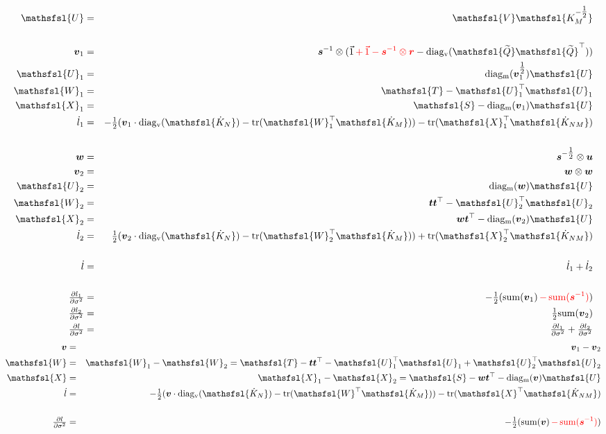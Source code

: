 \documentclass[10pt]{report}
\newcommand{\red}{\textcolor{red}}
\newcommand{\blue}{\textcolor{blue}}
\newcommand{\onehalf}{\tfrac{1}{2}}
\newcommand{\mat}[1]{\mbox{$\mathsfsl{#1}$}}
\newcommand{\myvec}[1]{\mbox{\boldmath$#1$}}
\newcommand{\diagv}[1]{\mathrm{diag_v}(#1)}
\newcommand{\diagm}[1]{\mathrm{diag_m}(#1)}
\newcommand{\trace}[1]{\mathrm{tr}(#1)}
\newcommand{\transv}[1]{\myvec{#1}^\top}
\newcommand{\transm}[1]{\mat{#1}^\top}
\newcommand{\ichol}[1]{\mat{#1^{-\onehalf}}}
\newcommand{\dKm}{\mat{\dot{K}_M}}
\newcommand{\dKn}{\mat{\dot{K}_N}}
\newcommand{\dKnm}{\mat{\dot{K}_{NM}}}
\newcommand{\dl}{\dot{l}}
\newcommand{\vecu}{\myvec{u}}
\newcommand{\vecr}{\myvec{r}}
\newcommand{\vect}{\myvec{t}}
\newcommand{\vecw}{\myvec{w}}
\newcommand{\vecv}{\myvec{v}}
\newcommand{\vecvx}{\myvec{v}_1}
\newcommand{\vecvy}{\myvec{v}_2}
\newcommand{\vecis}{\myvec{s}^{-1}}
\newcommand{\veciss}{\myvec{s}^{-\onehalf}}
\newcommand{\matQn}{\mat{\widetilde{Q}}}
\newcommand{\tmatQn}{\transm{\widetilde{Q}}}
\newcommand{\matS}{\mat{S}}
\newcommand{\matT}{\mat{T}}
\newcommand{\matU}{\mat{U}}
\newcommand{\matUx}{\mat{U}_1}
\newcommand{\matUy}{\mat{U}_2}
\newcommand{\matW}{\mat{W}}
\newcommand{\matWx}{\mat{W}_1}
\newcommand{\matX}{\mat{X}}
\newcommand{\matXx}{\mat{X}_1}
\newcommand{\matWy}{\mat{W}_2}
\newcommand{\matXy}{\mat{X}_2}
\begin{document}
\begin{eqnarray*}
\matU & = & \mat{V} \ichol{K_M} \\
\\
\vecvx & = & \vecis \otimes (\vec{1} \red{\, + \, \vec{1} - \vecis \otimes \vecr} - \diagv{\matQn\tmatQn}) \\
\matUx & = & \diagm{\vecvx^{\onehalf}} \matU \\
\matWx & = & \matT - \matUx^\top\matUx \\
\matXx & = & \matS - \diagm{\vecvx}\matU \\
\dl_1 & = & -\onehalf(\vecvx \cdot \diagv{\dKn} - \trace{\transm{W}_1\dKm}) - \trace{\transm{X}_1\dKnm} \\
\\
\vecw & = & \veciss \otimes \vecu \\
\vecvy & = & \vecw \otimes \vecw \\
\matUy & = & \diagm{\vecw} \matU \\
\matWy & = & \vect \vect^\top - \matUy^\top\matUy \\
\matXy & = & \vecw\vect^\top - \diagm{\vecvy}\matU \\
\dl_2 & = & \onehalf(\vecvy \cdot \diagv{\dKn} - \trace{\transm{W}_2\dKm}) + \trace{\transm{X}_2\dKnm} \\
\\
\dl & = & \dl_1 + \dl_2 \\
\\
\tfrac{\partial l_1}{\partial\sigma^2} & = & -\onehalf(\mathrm{sum}(\vecvx) \red{\, - \, \mathrm{sum}(\vecis)}) \\
\tfrac{\partial l_2}{\partial\sigma^2} & = & \onehalf\mathrm{sum}(\vecvy) \\
\tfrac{\partial l}{\partial\sigma^2} & = & \tfrac{\partial l_1}{\partial\sigma^2} + \tfrac{\partial l_2}{\partial\sigma^2}
\end{eqnarray*}
\blue{
\begin{eqnarray*}
\vecv & = & \vecvx - \vecvy  \\
\matW & = & \matWx - \matWy = \matT - \vect \transv{t} - \matUx^\top\matUx + \matUy^\top\matUy \\
\matX & = & \matXx - \matXy = \matS - \vecw \transv{t} - \diagm{\vecv}\matU \\
\dl & = & -\onehalf(\vecv \cdot \diagv{\dKn} - \trace{\transm{W}\dKm}) - \trace{\transm{X}\dKnm} \\
\\
\tfrac{\partial l}{\partial\sigma^2} & = & -\onehalf(\mathrm{sum}(\vecv) \red{\, - \, \mathrm{sum}(\vecis)}) \\
\end{eqnarray*}
}
\end{document}
